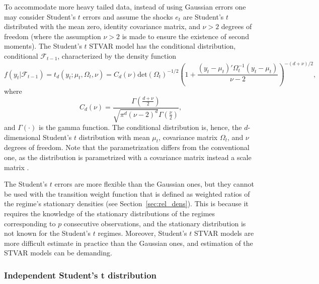 \documentclass[nojss]{jss}
\begin{document}
To accommodate more heavy tailed data, instead of using Gaussian errors one may consider Student's $t$ errors and assume the shocks $e_t$ are Student's $t$ distributed with the mean zero, identity covariance matrix, and $\nu>2$ degrees of freedom (where the assumption $\nu>2$ is made to ensure the existence of second moments). The Student's $t$ STVAR model has the conditional distribution, conditional $\mathcal{F}_{t-1}$, characterized by the density function
\begin{equation}
f(y_t|\mathcal{F}_{t-1}) = t_d(y_t;\mu_t,\Omega_t,\nu)=C_d(\nu)\text{det}(\Omega_t)^{-1/2}\left(1+\frac{(y_t -\mu_t)'\Omega_t^{-1}(y_t - \mu_t)}{\nu-2}\right)^{-(d+\nu)/2},
\end{equation}
where
\begin{equation}
C_d(\nu)=\frac{\Gamma\left(\frac{d+\nu}{2}\right)}{\sqrt{\pi^d(\nu-2)^d}\Gamma\left(\frac{\nu}{2}\right)},
\end{equation}
and $\Gamma\left(\cdot\right)$ is the gamma function. The conditional distribution is, hence, the $d$-dimensional Student's $t$ distribution with mean $\mu_t$, covariance matrix $\Omega_t$, and $\nu$ degrees of freedom. Note that the parametrization differs from the conventional one, as the distribution is parametrized with a covariance matrix instead a scale matrix \cite[see, e.g.,][Appendix~A for details about the parametrization]{Meitz+Preve+Saikkonen:2023}.

The Student's $t$ errors are more flexible than the Gaussian ones, but they cannot be used with the transition weight function that is defined as weighted ratios of the regime's stationary densities (see Section~\ref{sec:rel_dens}). This is because it requires the knowledge of the stationary distributions of the regimes corresponding to $p$ consecutive observations, and the stationary distribution is not known for the Student's $t$ regimes. Moreover, Student's $t$ STVAR models are more difficult estimate in practice than the Gaussian ones, and estimation of the STVAR models can be demanding.

\subsubsection{Independent Student's t distribution}\label{sec:indstudent}
\end{document}

